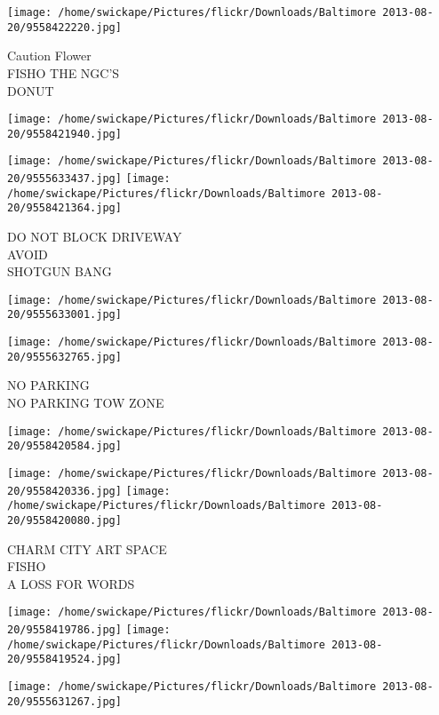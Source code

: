\documentclass[10pt,letterpaper]{article}
\begin{document}
\texttt{[image: /home/swickape/Pictures/flickr/Downloads/Baltimore 2013-08-20/9558422220.jpg]}

Caution Flower\\
FISHO THE NGC'S\\
DONUT\\
\pagebreak

\texttt{[image: /home/swickape/Pictures/flickr/Downloads/Baltimore 2013-08-20/9558421940.jpg]}

\vspace{0.25in}
\texttt{[image: /home/swickape/Pictures/flickr/Downloads/Baltimore 2013-08-20/9555633437.jpg]}
\texttt{[image: /home/swickape/Pictures/flickr/Downloads/Baltimore 2013-08-20/9558421364.jpg]}

DO NOT BLOCK DRIVEWAY\\
AVOID\\
SHOTGUN BANG\\
\pagebreak

\texttt{[image: /home/swickape/Pictures/flickr/Downloads/Baltimore 2013-08-20/9555633001.jpg]}

\vspace{0.25in}
\texttt{[image: /home/swickape/Pictures/flickr/Downloads/Baltimore 2013-08-20/9555632765.jpg]}

NO PARKING\\
NO PARKING TOW ZONE\\
\pagebreak

\texttt{[image: /home/swickape/Pictures/flickr/Downloads/Baltimore 2013-08-20/9558420584.jpg]}

\vspace{0.25in}
\texttt{[image: /home/swickape/Pictures/flickr/Downloads/Baltimore 2013-08-20/9558420336.jpg]}
\texttt{[image: /home/swickape/Pictures/flickr/Downloads/Baltimore 2013-08-20/9558420080.jpg]}

CHARM CITY ART SPACE\\
FISHO\\
A LOSS FOR WORDS\\
\pagebreak

\texttt{[image: /home/swickape/Pictures/flickr/Downloads/Baltimore 2013-08-20/9558419786.jpg]}
\texttt{[image: /home/swickape/Pictures/flickr/Downloads/Baltimore 2013-08-20/9558419524.jpg]}

\vspace{0.25in}
\texttt{[image: /home/swickape/Pictures/flickr/Downloads/Baltimore 2013-08-20/9555631267.jpg]}
\end{document}
